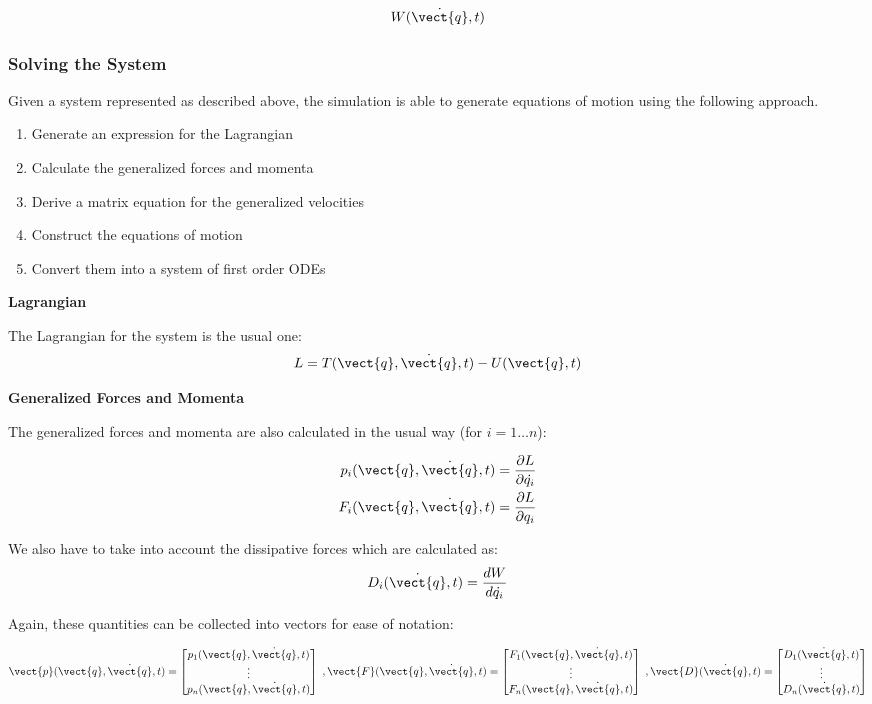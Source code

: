 \[
    W(\Dot{\vect{q}}, t)
\]

\subsubsection{Solving the System}

Given a system represented as described above, the simulation is able to generate equations of motion using the following approach.

\begin{enumerate}
  \item Generate an expression for the Lagrangian
  \item Calculate the generalized forces and momenta
  \item Derive a matrix equation for the generalized velocities
  \item Construct the equations of motion
  \item Convert them into a system of first order ODEs
\end{enumerate}

\textbf{Lagrangian}

The Lagrangian for the system is the usual one:
\[
    L = T(\vect{q}, \Dot{\vect{q}}, t) - U(\vect{q}, t)
\]

\textbf{Generalized Forces and Momenta}

The generalized forces and momenta are also calculated in the usual way (for $i = 1 \dots n$):

\begin{align}
    p_i(\vect{q}, \Dot{\vect{q}}, t) = \frac{\partial L}{\partial \dot{q_i}} \label{sim_p_i}\\
    F_i(\vect{q}, \Dot{\vect{q}}, t) = \frac{\partial L}{\partial q_i} \label{sim_F_i}
\end{align}

We also have to take into account the dissipative forces which are calculated as:
\begin{align}
    D_i(\Dot{\vect{q}}, t) = \frac{d W}{d\Dot{q_i}} \label{sim_D_i}
\end{align}

Again, these quantities can be collected into vectors for ease of notation:

\[
    \vect{p}(\vect{q}, \Dot{\vect{q}}, t) = \begin{bmatrix}p_1(\vect{q}, \Dot{\vect{q}}, t) \\ \vdots \\ p_n(\vect{q}, \Dot{\vect{q}}, t)\end{bmatrix} \;,
    \vect{F}(\vect{q}, \Dot{\vect{q}}, t) = \begin{bmatrix}F_1(\vect{q}, \Dot{\vect{q}}, t) \\ \vdots \\ F_n(\vect{q}, \Dot{\vect{q}}, t)\end{bmatrix} \;,
    \vect{D}(\Dot{\vect{q}}, t) = \begin{bmatrix}D_1(\Dot{\vect{q}}, t) \\ \vdots \\ D_n(\Dot{\vect{q}}, t)\end{bmatrix}
\]


